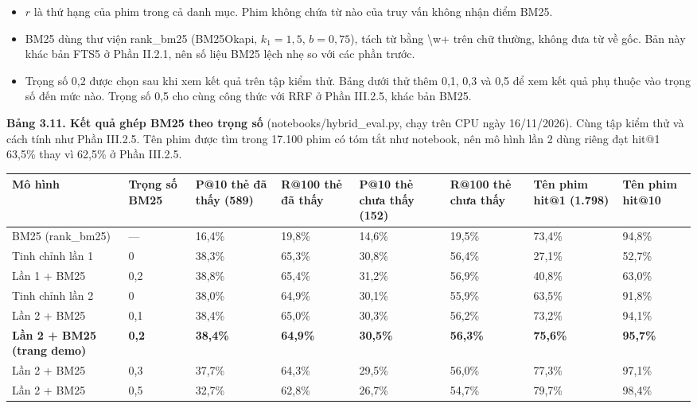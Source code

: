\documentclass[12pt,a4paper]{article}
\providecommand{\tightlist}{\setlength{\itemsep}{0pt}\setlength{\parskip}{0pt}}
\newcommand{\np}{\Needspace{8\baselineskip}}
\begin{document}
\begin{itemize}
\tightlist
\item $r$ là thứ hạng của phim trong cả danh mục. Phim không chứa từ nào của truy vấn không nhận điểm BM25.
\item BM25 dùng thư viện rank\_bm25 (BM25Okapi, $k_1 = 1{,}5$, $b = 0{,}75$), tách từ bằng \textbackslash w+ trên chữ thường, không đưa từ về gốc. Bản này khác bản FTS5 ở Phần II.2.1, nên số liệu BM25 lệch nhẹ so với các phần trước.
\item Trọng số 0,2 được chọn sau khi xem kết quả trên tập kiểm thử. Bảng dưới thử thêm 0,1, 0,3 và 0,5 để xem kết quả phụ thuộc vào trọng số đến mức nào. Trọng số 0,5 cho cùng công thức với RRF ở Phần III.2.5, khác bản BM25.
\end{itemize}

\np\textbf{Bảng 3.11. Kết quả ghép BM25 theo trọng số} (notebooks/hybrid\_eval.py, chạy trên CPU ngày 16/11/2026). Cùng tập kiểm thử và cách tính như Phần III.2.5. Tên phim được tìm trong 17.100 phim có tóm tắt như notebook, nên mô hình lần 2 dùng riêng đạt hit@1 63,5\% thay vì 62,5\% ở Phần III.2.5.

{\def\LTcaptype{}\footnotesize
\begin{longtable}[]{@{}*{8}{P{(\linewidth - 14\tabcolsep) * }}@{}}
\toprule
\textbf{Mô hình} & \textbf{Trọng số BM25} & \textbf{P@10 thẻ đã thấy (589)} & \textbf{R@100 thẻ đã thấy} & \textbf{P@10 thẻ chưa thấy (152)} & \textbf{R@100 thẻ chưa thấy} & \textbf{Tên phim hit@1 (1.798)} & \textbf{Tên phim hit@10} \\
\midrule
\endhead
\bottomrule
\endlastfoot
BM25 (rank\_bm25) & --- & 16,4\% & 19,8\% & 14,6\% & 19,5\% & 73,4\% & 94,8\% \\
Tinh chỉnh lần 1 & 0 & 38,3\% & 65,3\% & 30,8\% & 56,4\% & 27,1\% & 52,7\% \\
Lần 1 + BM25 & 0,2 & 38,8\% & 65,4\% & 31,2\% & 56,9\% & 40,8\% & 63,0\% \\
Tinh chỉnh lần 2 & 0 & 38,0\% & 64,9\% & 30,1\% & 55,9\% & 63,5\% & 91,8\% \\
Lần 2 + BM25 & 0,1 & 38,4\% & 65,0\% & 30,3\% & 56,2\% & 73,2\% & 94,1\% \\
\textbf{Lần 2 + BM25 (trang demo)} & \textbf{0,2} & \textbf{38,4\%} & \textbf{64,9\%} & \textbf{30,5\%} & \textbf{56,3\%} & \textbf{75,6\%} & \textbf{95,7\%} \\
Lần 2 + BM25 & 0,3 & 37,7\% & 64,3\% & 29,5\% & 56,0\% & 77,3\% & 97,1\% \\
Lần 2 + BM25 & 0,5 & 32,7\% & 62,8\% & 26,7\% & 54,7\% & 79,7\% & 98,4\% \\
\end{longtable}
}
\end{document}
